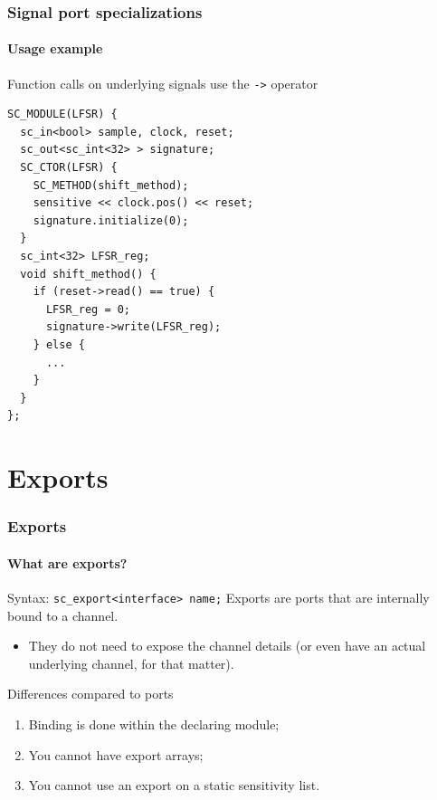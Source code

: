 \begin{frame}[fragile]
\frametitle{Signal port specializations}
\framesubtitle{Usage example}
\begin{block}{Function calls on underlying signals use the \texttt{->} operator}
\vspace{-0.5em}
{\scriptsize
\begin{verbatim}
SC_MODULE(LFSR) {
  sc_in<bool> sample, clock, reset;
  sc_out<sc_int<32> > signature;
  SC_CTOR(LFSR) {
    SC_METHOD(shift_method);
    sensitive << clock.pos() << reset;
    signature.initialize(0);
  }
  sc_int<32> LFSR_reg;
  void shift_method() {
    if (reset->read() == true) {
      LFSR_reg = 0;
      signature->write(LFSR_reg);
    } else {
      ...
    }
  }
};
\end{verbatim}
}
\vspace{-0.5em}
\end{block}
\end{frame}

\section{Exports}

\begin{frame}[fragile]
\frametitle{Exports}
\framesubtitle{What are exports?}
\begin{block}{Syntax: \texttt{sc\_export<interface> name;}}
Exports are ports that are internally bound to a channel.
\begin{itemize}
\item They do not need to expose the channel details (or even have an actual underlying channel, for that matter).
\end{itemize}
\end{block}
\pause
\begin{block}{Differences compared to ports}
\begin{enumerate}
\item Binding is done within the declaring module;
\item You cannot have export arrays;
\item You cannot use an export on a static sensitivity list.
\end{enumerate}
\end{block}

\end{frame}

